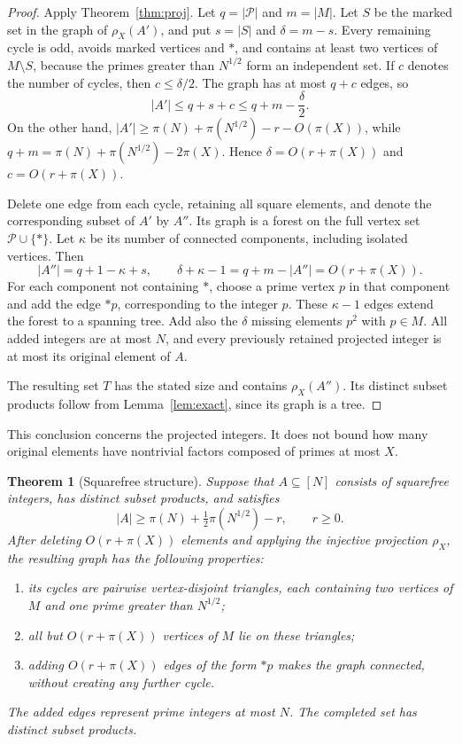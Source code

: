 \documentclass[11pt]{article}
\numberwithin{equation}{section}
\newtheorem{theorem}{Theorem}[section]
\theoremstyle{remark}
\begin{document}
\begin{proof}
Apply Theorem~\ref{thm:proj}. Let $q=|\mathcal P|$ and $m=|M|$. Let $S$ be the marked set in the graph of $\rho_X(A')$, and put $s=|S|$ and $\delta=m-s$. Every remaining cycle is odd, avoids marked vertices and $*$, and contains at least two vertices of $M\setminus S$, because the primes greater than $N^{1/2}$ form an independent set. If $c$ denotes the number of cycles, then $c\le\delta/2$. The graph has at most $q+c$ edges, so
\[
|A'|\le q+s+c\le q+m-\frac\delta2.
\]
On the other hand, $|A'|\ge\pi(N)+\pi(N^{1/2})-r-O(\pi(X))$, while $q+m=\pi(N)+\pi(N^{1/2})-2\pi(X)$. Hence $\delta=O(r+\pi(X))$ and $c=O(r+\pi(X))$.

Delete one edge from each cycle, retaining all square elements, and denote the corresponding subset of $A'$ by $A''$. Its graph is a forest on the full vertex set $\mathcal P\cup\{*\}$. Let $\kappa$ be its number of connected components, including isolated vertices. Then
\[
|A''|=q+1-\kappa+s,\qquad\delta+\kappa-1=q+m-|A''|=O(r+\pi(X)).
\]
For each component not containing $*$, choose a prime vertex $p$ in that component and add the edge $*p$, corresponding to the integer $p$. These $\kappa-1$ edges extend the forest to a spanning tree. Add also the $\delta$ missing elements $p^2$ with $p\in M$. All added integers are at most $N$, and every previously retained projected integer is at most its original element of $A$.

The resulting set $T$ has the stated size and contains $\rho_X(A'')$. Its distinct subset products follow from Lemma~\ref{lem:exact}, since its graph is a tree.
\end{proof}

This conclusion concerns the projected integers. It does not bound how many original elements have nontrivial factors composed of primes at most $X$.

\begin{theorem}[Squarefree structure]\label{thm:sfstruct}
Suppose that $A\subseteq[N]$ consists of squarefree integers, has distinct subset products, and satisfies
\[
|A|\ge\pi(N)+\tfrac12\pi(N^{1/2})-r,\qquad r\ge0.
\]
After deleting $O(r+\pi(X))$ elements and applying the injective projection $\rho_X$, the resulting graph has the following properties:
\begin{enumerate}
\item its cycles are pairwise vertex-disjoint triangles, each containing two vertices of $M$ and one prime greater than $N^{1/2}$;
\item all but $O(r+\pi(X))$ vertices of $M$ lie on these triangles;
\item adding $O(r+\pi(X))$ edges of the form $*p$ makes the graph connected, without creating any further cycle.
\end{enumerate}
The added edges represent prime integers at most $N$. The completed set has distinct subset products.
\end{theorem}
\end{document}
